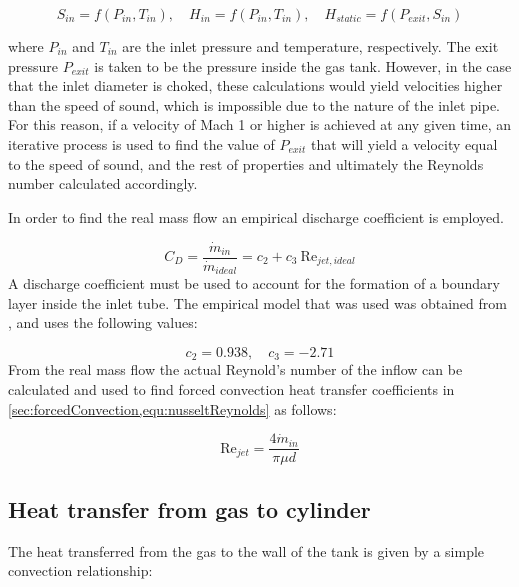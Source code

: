 \begin{equation}
S_{in} = f\left( P_{in}, T_{in} \right), \quad H_{in} = f\left( P_{in}, T_{in} \right), \quad H_{static} = f\left( P_{exit}, S_{in} \right)
\end{equation}

\noindent where $P_{in}$ and $T_{in}$ are the inlet pressure and temperature, respectively. The exit pressure $P_{exit}$ is taken to be the pressure inside the gas tank. However, in the case that the inlet diameter is choked, these calculations would yield velocities higher than the speed of sound, which is impossible due to the nature of the inlet pipe. For this reason, if a velocity of Mach 1 or higher is achieved at any given time, an iterative process is used to find the value of $P_{exit}$ that will yield a velocity equal to the speed of sound, and the rest of properties and ultimately the Reynolds number calculated accordingly.

In order to find the real mass flow an empirical discharge coefficient is employed.

\begin{equation}
C_D = \frac{\dot{m}_{in}}{\dot{m}_{ideal}} = c_2+ c_3 \:\text{Re}_{jet,ideal} 
\end{equation}
A discharge coefficient must be used to account for the formation of a boundary layer inside the inlet tube. The empirical model that was used was obtained from , and uses the following values:

\begin{equation}
c_2 =  0.938 ,  \quad c_3 = -2.71
\end{equation}
From the real mass flow the actual Reynold's number of the inflow can be calculated and used to find forced convection heat transfer coefficients in \cref{sec:forcedConvection,equ:nusseltReynolds} as follows: 

\begin{equation}
\text{Re}_{jet} = \frac{4\dot m_{in}}{\pi \mu d}
\end{equation}




\subsection{Heat transfer from gas to cylinder}

The heat transferred from the gas to the wall of the tank is given by a simple convection relationship:

